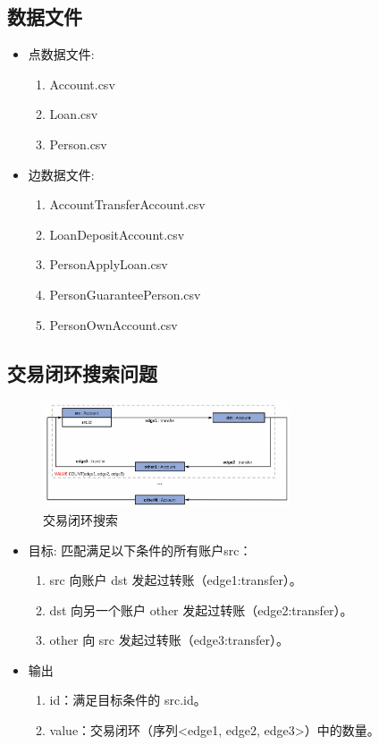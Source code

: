 \subsection{数据文件}
\begin{itemize}
  \item 点数据文件:
    \begin{enumerate}
      \item Account.csv
      \item Loan.csv
      \item Person.csv
    \end{enumerate}
  \item 边数据文件:
    \begin{enumerate}
      \item AccountTransferAccount.csv
      \item LoanDepositAccount.csv
      \item PersonApplyLoan.csv
      \item PersonGuaranteePerson.csv
      \item PersonOwnAccount.csv
    \end{enumerate}
\end{itemize}

\subsection{交易闭环搜索问题} \label{pro1}
\begin{figure}[H]
  \begin{center}
    \includegraphics[width=0.65\textwidth]{./figures/蚂蚁改5-264319.png}
  \end{center}
  \caption{交易闭环搜索}
\end{figure}

\begin{itemize}
  \item 目标: 匹配满足以下条件的所有账户src：
    \begin{enumerate}
      \item src 向账户 dst 发起过转账（edge1:transfer）。
      \item dst 向另一个账户 other 发起过转账（edge2:transfer）。
      \item other 向 src 发起过转账（edge3:transfer）。
    \end{enumerate}
  \item 输出
    \begin{enumerate}
      \item id：满足目标条件的 src.id。
      \item value：交易闭环（序列<edge1, edge2, edge3>）中的数量。
    \end{enumerate}
\end{itemize}

